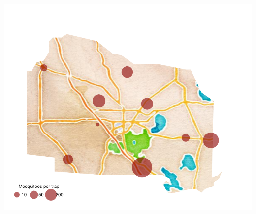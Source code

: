 \documentclass{article}
\begin{document}
\begin{multicols}{2}
\includegraphics{mosquitoReport-003}

\end{multicols}


\vspace{10mm}
\end{document}
